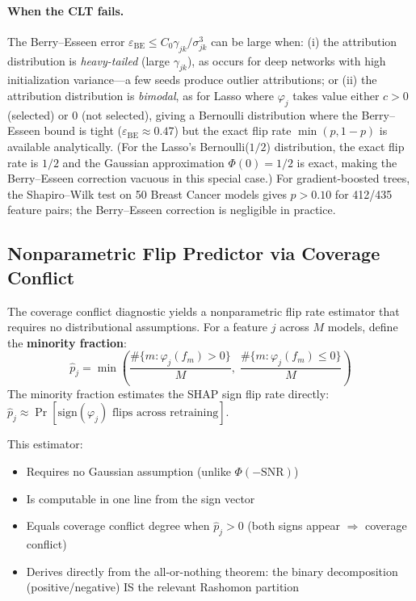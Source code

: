 \documentclass{article}
\begin{document}
\paragraph{When the CLT fails.}
The Berry--Esseen error $\varepsilon_{\text{BE}} \leq C_0 \gamma_{jk}/\sigma_{jk}^3$ can be large when: (i) the attribution distribution is \emph{heavy-tailed} (large $\gamma_{jk}$), as occurs for deep networks with high initialization variance---a few seeds produce outlier attributions; or (ii) the attribution distribution is \emph{bimodal}, as for Lasso where $\varphi_j$ takes value either $c > 0$ (selected) or $0$ (not selected), giving a Bernoulli distribution where the Berry--Esseen bound is tight ($\varepsilon_{\text{BE}} \approx 0.47$) but the exact flip rate $\min(p, 1-p)$ is available analytically. (For the Lasso's Bernoulli($1/2$) distribution, the exact flip rate is $1/2$ and the Gaussian approximation $\Phi(0) = 1/2$ is exact, making the Berry--Esseen correction vacuous in this special case.) For gradient-boosted trees, the Shapiro--Wilk test on 50 Breast Cancer models gives $p > 0.10$ for 412/435 feature pairs; the Berry--Esseen correction is negligible in practice.

\subsection{Nonparametric Flip Predictor via Coverage Conflict}
\label{sec:nonparametric-flip}

The coverage conflict diagnostic yields a nonparametric flip rate estimator that requires no distributional assumptions. For a feature $j$ across $M$ models, define the \textbf{minority fraction}:
$$\hat{p}_j = \min\!\left(\frac{\#\{m : \varphi_j(f_m) > 0\}}{M},\; \frac{\#\{m : \varphi_j(f_m) \leq 0\}}{M}\right)$$
The minority fraction estimates the SHAP sign flip rate directly: $\hat{p}_j \approx \Pr[\text{sign}(\varphi_j) \text{ flips across retraining}]$.

This estimator:
\begin{itemize}
  \item Requires no Gaussian assumption (unlike $\Phi(-\text{SNR})$)
  \item Is computable in one line from the sign vector
  \item Equals coverage conflict degree when $\hat{p}_j > 0$ (both signs appear $\Rightarrow$ coverage conflict)
  \item Derives directly from the all-or-nothing theorem: the binary decomposition (positive/negative) IS the relevant Rashomon partition
\end{itemize}
\end{document}
